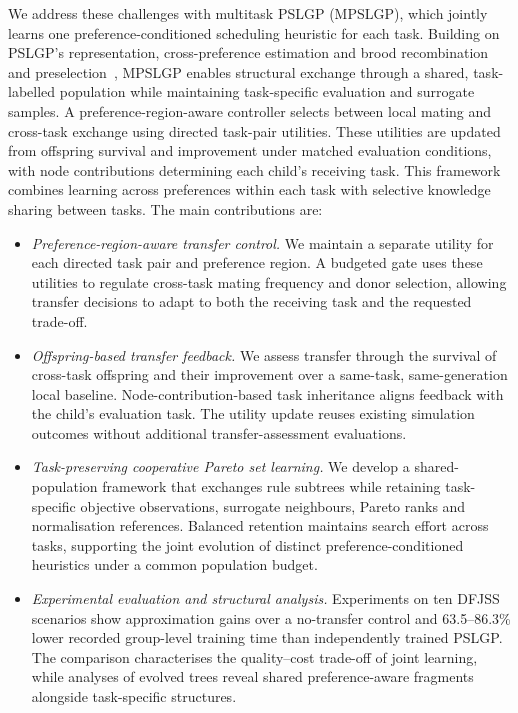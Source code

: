 \documentclass[10pt,journal]{IEEEtran}
\begin{document}
We address these challenges with multitask PSLGP (MPSLGP), which jointly learns one preference-conditioned scheduling heuristic for each task. Building on PSLGP's representation, cross-preference estimation and brood recombination and preselection~\cite{xu2026pslgp}, MPSLGP enables structural exchange through a shared, task-labelled population while maintaining task-specific evaluation and surrogate samples. A preference-region-aware controller selects between local mating and cross-task exchange using directed task-pair utilities. These utilities are updated from offspring survival and improvement under matched evaluation conditions, with node contributions determining each child's receiving task. This framework combines learning across preferences within each task with selective knowledge sharing between tasks. The main contributions are:
\begin{itemize}
    \item \emph{Preference-region-aware transfer control.}
    We maintain a separate utility for each directed task pair and preference region. A budgeted gate uses these utilities to regulate cross-task mating frequency and donor selection, allowing transfer decisions to adapt to both the receiving task and the requested trade-off.
    \item \emph{Offspring-based transfer feedback.}
    We assess transfer through the survival of cross-task offspring and their improvement over a same-task, same-generation local baseline. Node-contribution-based task inheritance aligns feedback with the child's evaluation task. The utility update reuses existing simulation outcomes without additional transfer-assessment evaluations.
    \item \emph{Task-preserving cooperative Pareto set learning.}
    We develop a shared-population framework that exchanges rule subtrees while retaining task-specific objective observations, surrogate neighbours, Pareto ranks and normalisation references. Balanced retention maintains search effort across tasks, supporting the joint evolution of distinct preference-conditioned heuristics under a common population budget.
    \item \emph{Experimental evaluation and structural analysis.}
    Experiments on ten DFJSS scenarios show approximation gains over a no-transfer control and 63.5--86.3\% lower recorded group-level training time than independently trained PSLGP. The comparison characterises the quality--cost trade-off of joint learning, while analyses of evolved trees reveal shared preference-aware fragments alongside task-specific structures.
\end{itemize}
\end{document}
